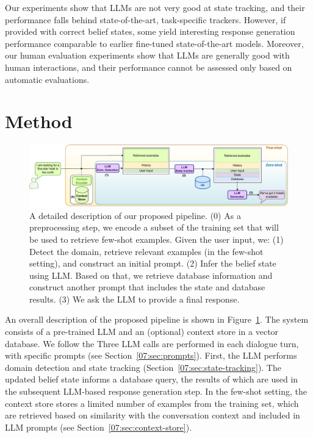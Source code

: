 Our experiments show that LLMs are not very good at state tracking, and their performance falls behind state-of-the-art, task-specific trackers.
However, if provided with correct belief states, some yield interesting response generation performance comparable to earlier fine-tuned state-of-the-art models.
Moreover, our human evaluation experiments show that LLMs are generally good with human interactions, and their performance cannot be assessed only based on automatic evaluations.

\section{Method}
\label{07:sec:method}
\begin{figure}[t]
    \centering
    \includegraphics[width=\textwidth]{images/llm-chatbot-v3.pdf}
    \caption{A detailed description of our proposed pipeline. (0) As a preprocessing step, we encode a subset of the training set that will be used to retrieve few-shot examples.
    Given the user input, we: (1) Detect the domain, retrieve relevant examples (in the few-shot setting), and construct an initial prompt. (2) Infer the belief state using LLM. Based on that, we retrieve database information and construct another prompt that includes the state and database results. (3) We ask the LLM to provide a final response.}
    \label{07:fig:overview_low_level}
\end{figure}
An overall description of the proposed pipeline is shown in Figure~\ref{07:fig:overview_low_level}.
The system consists of a pre-trained LLM and an (optional) context store in a vector database.
We follow the 
Three LLM calls are performed in each dialogue turn, with specific prompts (see Section~\ref{07:sec:prompts}).
First, the LLM performs domain detection and state tracking (Section~\ref{07:sec:state-tracking}). The updated belief state informs a database query, the results of which are used in the subsequent LLM-based response generation step.
In the few-shot setting, the context store stores a limited number of examples from the training set, which are retrieved based on similarity with the conversation context and included in LLM prompts (see Section~\ref{07:sec:context-store}).


